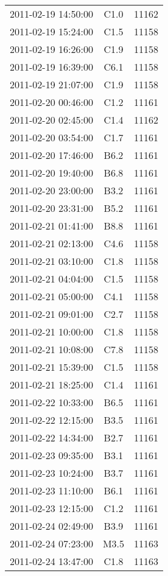 \documentclass{article}
\begin{document}
\begin{table}
\begin{tabular}{c|c|c}
			2011-02-19 14:50:00 & C1.0 & 11162 \\ 
			2011-02-19 15:24:00 & C1.5 & 11158 \\ 
			2011-02-19 16:26:00 & C1.9 & 11158 \\ 
			2011-02-19 16:39:00 & C6.1 & 11158 \\ 
			2011-02-19 21:07:00 & C1.9 & 11158 \\ 
			2011-02-20 00:46:00 & C1.2 & 11161 \\ 
			2011-02-20 02:45:00 & C1.4 & 11162 \\ 
			2011-02-20 03:54:00 & C1.7 & 11161 \\ 
			2011-02-20 17:46:00 & B6.2 & 11161 \\ 
			2011-02-20 19:40:00 & B6.8 & 11161 \\ 
			2011-02-20 23:00:00 & B3.2 & 11161 \\ 
			2011-02-20 23:31:00 & B5.2 & 11161 \\ 
			2011-02-21 01:41:00 & B8.8 & 11161 \\ 
			2011-02-21 02:13:00 & C4.6 & 11158 \\ 
			2011-02-21 03:10:00 & C1.8 & 11158 \\ 
			2011-02-21 04:04:00 & C1.5 & 11158 \\ 
			2011-02-21 05:00:00 & C4.1 & 11158 \\ 
			2011-02-21 09:01:00 & C2.7 & 11158 \\ 
			2011-02-21 10:00:00 & C1.8 & 11158 \\ 
			2011-02-21 10:08:00 & C7.8 & 11158 \\ 
			2011-02-21 15:39:00 & C1.5 & 11158 \\ 
			2011-02-21 18:25:00 & C1.4 & 11161 \\ 
			2011-02-22 10:33:00 & B6.5 & 11161 \\ 
			2011-02-22 12:15:00 & B3.5 & 11161 \\ 
			2011-02-22 14:34:00 & B2.7 & 11161 \\ 
			2011-02-23 09:35:00 & B3.1 & 11161 \\ 
			2011-02-23 10:24:00 & B3.7 & 11161 \\ 
			2011-02-23 11:10:00 & B6.1 & 11161 \\ 
			2011-02-23 12:15:00 & C1.2 & 11161 \\ 
			2011-02-24 02:49:00 & B3.9 & 11161 \\ 
			2011-02-24 07:23:00 & M3.5 & 11163 \\ 
			2011-02-24 13:47:00 & C1.8 & 11163 \\ 

\end{tabular}
\end{table}
\end{document}
